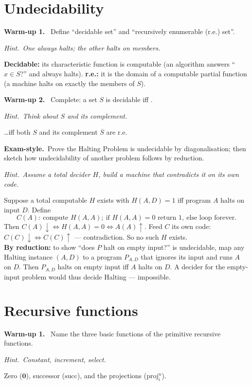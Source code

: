 \documentclass[11pt,a4paper]{article}
\newcommand{\hint}[1]{\par{\small\textcolor{accent}{\textit{Hint.}}\ \textit{#1}}\par\smallskip}
\newcommand{\warm}[1]{\smallskip\textbf{\textcolor{hi}{Warm-up #1.}}\ }
\newcommand{\exam}{\smallskip\textbf{\textcolor{warn}{Exam-style.}}\ }
\begin{document}
\section{Undecidability}

\warm{1} Define ``decidable set'' and ``recursively enumerable (r.e.) set''.
\hint{One always halts; the other halts on members.}
\begin{sol}\textbf{Decidable:} its characteristic function is computable (an algorithm answers ``$x\in S$?'' and always halts). \textbf{r.e.:} it is the domain of a computable partial function (a machine halts on exactly the members of $S$).\end{sol}

\warm{2} Complete: a set $S$ is decidable iff \underline{\hspace{3cm}}.
\hint{Think about $S$ and its complement.}
\begin{sol}\dots iff both $S$ and its complement $\overline S$ are r.e.\end{sol}

\exam Prove the Halting Problem is undecidable by diagonalisation; then sketch how undecidability of another problem follows by reduction.
\hint{Assume a total decider $H$, build a machine that contradicts it on its own code.}
\begin{sol}
Suppose a total computable $H$ exists with $H(A,D)=1$ iff program $A$ halts on input $D$. Define
\[
C(A):\ \text{compute }H(A,A);\ \text{if }H(A,A)=0\text{ return }1,\ \text{else loop forever.}
\]
Then $C(A){\downarrow}\iff H(A,A)=0\iff A(A){\uparrow}$. Feed $C$ its own code: $C(C){\downarrow}\iff C(C){\uparrow}$ --- contradiction. So no such $H$ exists.\\[3pt]
\textbf{By reduction:} to show ``does $P$ halt on empty input?'' is undecidable, map any Halting instance $(A,D)$ to a program $P_{A,D}$ that ignores its input and runs $A$ on $D$. Then $P_{A,D}$ halts on empty input iff $A$ halts on $D$. A decider for the empty-input problem would thus decide Halting --- impossible.
\end{sol}

\section{Recursive functions}

\warm{1} Name the three basic functions of the primitive recursive functions.
\hint{Constant, increment, select.}
\begin{sol}Zero ($\mathbf 0$), successor ($\mathrm{succ}$), and the projections ($\mathrm{proj}^n_i$).\end{sol}
\end{document}
